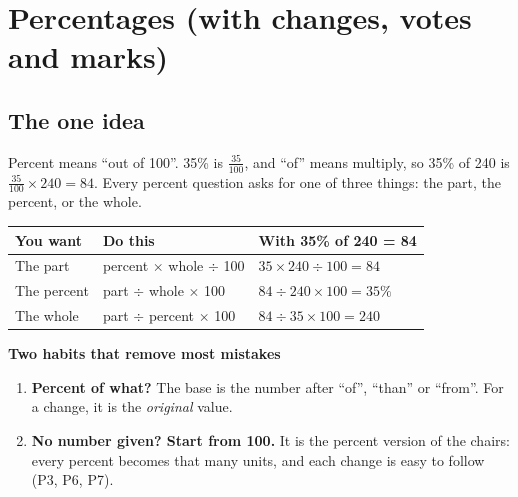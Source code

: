 \documentclass[11pt,a4paper]{article}
\let\oldsubsection\subsection
\renewcommand{\subsection}{\needspace{9\baselineskip}\oldsubsection}
\newcommand{\infobox}[2]{\par\medskip\noindent\begingroup\setlength{\fboxsep}{7pt}%
  \colorbox{codebg}{\parbox{\dimexpr\linewidth-14pt\relax}{\textbf{\color{ember}#1}\par\smallskip #2}}\endgroup\par\medskip}
\begin{document}
\clearpage
\section[Percentages (P1--P12)]{Percentages (with changes, votes and marks)}\label{ch:P}

\subsection*{The one idea}
Percent means ``out of 100''. 35\% is $\tfrac{35}{100}$, and ``of'' means multiply, so 35\% of 240 is $\tfrac{35}{100}\times 240 = 84$. Every percent question asks for one of three things: the part, the percent, or the whole.

\begin{center}\small\renewcommand{\arraystretch}{1.18}\setlength{\tabcolsep}{9pt}
\begin{tabular}{@{}lll@{}}
\toprule
\textbf{\color{slate}You want} & \textbf{\color{slate}Do this} & \textbf{\color{slate}With 35\% of 240 = 84} \\ \midrule
The part & percent $\times$ whole $\div$ 100 & $35 \times 240 \div 100 = 84$ \\
The percent & part $\div$ whole $\times$ 100 & $84 \div 240 \times 100 = 35\%$ \\
The whole & part $\div$ percent $\times$ 100 & $84 \div 35 \times 100 = 240$ \\
\bottomrule
\end{tabular}\end{center}

\infobox{Two habits that remove most mistakes}{
\begin{enumerate}
\item \textbf{Percent of what?} The base is the number after ``of'', ``than'' or ``from''. For a change, it is the \emph{original} value.
\item \textbf{No number given? Start from 100.} It is the percent version of the chairs: every percent becomes that many units, and each change is easy to follow (P3, P6, P7).
\end{enumerate}}
\end{document}

